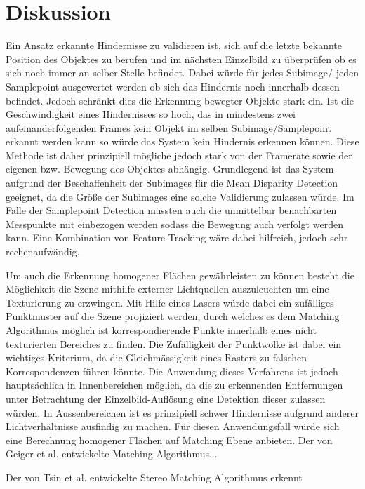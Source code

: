 \section{Diskussion}
\label{sec:conflict_discussion}
Ein Ansatz erkannte Hindernisse zu validieren ist, sich auf die letzte bekannte Position des Objektes zu berufen und im nächsten Einzelbild zu überprüfen ob es sich noch immer an selber Stelle befindet. Dabei würde für jedes Subimage/ jeden Samplepoint ausgewertet werden ob sich das Hindernis noch innerhalb dessen befindet. Jedoch schränkt dies die Erkennung bewegter Objekte stark ein. Ist die Geschwindigkeit eines Hindernisses so hoch, das in mindestens zwei aufeinanderfolgenden Frames kein Objekt im selben Subimage/Samplepoint erkannt werden kann so würde das System kein Hindernis erkennen können. Diese Methode ist daher prinzipiell mögliche jedoch stark von der Framerate sowie der eigenen bzw. Bewegung des Objektes abhängig. Grundlegend ist das System aufgrund der Beschaffenheit der Subimages für die Mean Disparity Detection geeignet, da die Größe der Subimages eine solche Validierung zulassen würde. Im Falle der Samplepoint Detection müssten auch die unmittelbar benachbarten Messpunkte mit einbezogen werden sodass die Bewegung auch verfolgt werden kann. Eine Kombination von Feature Tracking wäre dabei hilfreich, jedoch sehr rechenaufwändig.

Um auch die Erkennung homogener Flächen gewährleisten zu können besteht die Möglichkeit die Szene mithilfe externer Lichtquellen auszuleuchten um eine Texturierung zu erzwingen. Mit Hilfe eines Lasers würde dabei ein zufälliges Punktmuster auf die Szene projiziert werden, durch welches es dem Matching Algorithmus möglich ist korrespondierende Punkte innerhalb eines nicht texturierten Bereiches zu finden. Die Zufälligkeit der Punktwolke ist dabei ein wichtiges Kriterium, da die Gleichmässigkeit eines Rasters zu falschen Korrespondenzen führen könnte. Die Anwendung dieses Verfahrens ist jedoch hauptsächlich in Innenbereichen möglich, da die zu erkennenden Entfernungen unter Betrachtung der Einzelbild-Auflösung eine Detektion dieser zulassen würden. In Aussenbereichen ist es prinzipiell schwer Hindernisse aufgrund anderer Lichtverhältnisse ausfindig zu machen. Für diesen Anwendungsfall würde sich eine Berechnung homogener Flächen auf Matching Ebene anbieten. Der von Geiger et al. \cite{geiger2011efficient} entwickelte Matching Algorithmus...

Der von Tsin et al. \cite{tsin2003stereo} entwickelte Stereo Matching Algorithmus erkennt 


